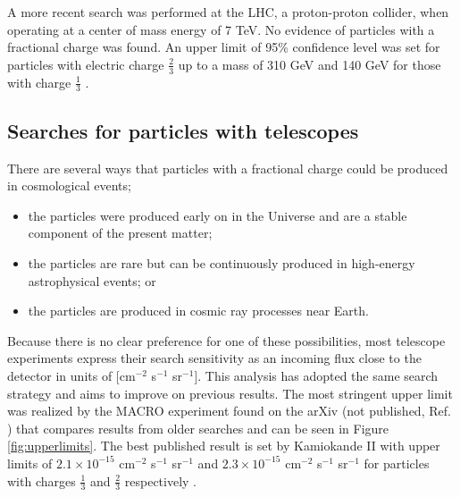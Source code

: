 A more recent search was performed at the LHC, a proton-proton collider, when operating at a center of mass energy of 7 TeV. No evidence of particles with a fractional charge was found. An upper limit of 95\% confidence level was set for particles with electric charge $\frac{2}{3}$ up to a mass of 310 GeV and 140 GeV for those with charge $\frac{1}{3}$ \cite{CMS:2012xi}.

\subsection{Searches for particles with telescopes}
There are several ways that particles with a fractional charge could be produced in cosmological events;

\vspace{2mm}
\begin{itemize}
\item the particles were produced early on in the Universe and are a stable component of the present matter;
\item the particles are rare but can be continuously produced in high-energy astrophysical events; or
\item the particles are produced in cosmic ray processes near Earth.
\end{itemize}
\vspace{2mm}

\noindent Because there is no clear preference for one of these possibilities, most telescope experiments express their search sensitivity as an incoming flux close to the detector in units of [cm$^{-2}$ s$^{-1}$ sr$^{-1}$]. This analysis has adopted the same search strategy and aims to improve on previous results. The most stringent upper limit was realized by the MACRO experiment found on the arXiv (not published, Ref. \cite{Ambrosio:2004ub}) that compares results from older searches and can be seen in Figure \ref{fig:upperlimits}. The best published result is set by Kamiokande II with upper limits of $2.1 \times 10^{-15}$ cm$^{-2}$ s$^{-1}$ sr$^{-1}$ and $2.3 \times 10^{-15}$ cm$^{-2}$ s$^{-1}$ sr$^{-1}$ for particles with charges $\frac{1}{3}$ and $\frac{2}{3}$ respectively \cite{Mori:1990kw}.

